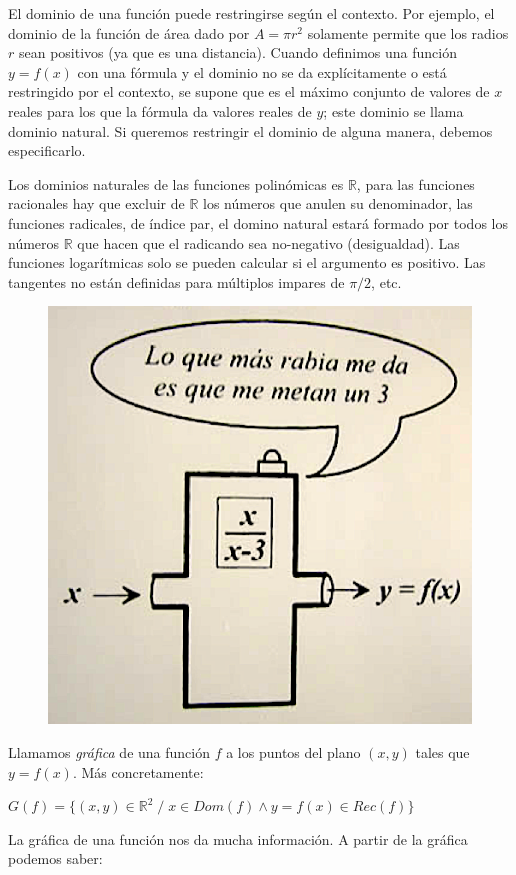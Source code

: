 		
	 El dominio de una función puede restringirse según el contexto. Por ejemplo, el dominio de la función de área dado por $A = \pi r^2$ solamente permite que los radios $r$ sean positivos (ya que es una distancia). Cuando definimos una función $y =f(x)$ con una fórmula y el dominio no se da explí­citamente o está restringido por el contexto, se supone que es el máximo conjunto de valores de $x$ reales para los que la fórmula da valores reales de $y$; este dominio se llama dominio natural. Si queremos restringir el dominio de alguna manera, debemos especificarlo.
	\begin{multicols}{2}
	Los dominios naturales de las funciones polinómicas es $\mathbb R$, para las funciones racionales hay que excluir de $\mathbb R$ los números que anulen su denominador, las funciones radicales, de í­ndice par, el domino natural estará formado por todos los números $\mathbb R$ que hacen que el radicando sea no-negativo (desigualdad). Las funciones logarí­tmicas solo se pueden calcular si el argumento es positivo. Las tangentes no están definidas para múltiplos impares de $\pi/2$, etc.
	
		\begin{figure}[H]
			\centering
			\includegraphics[width=0.35
			\textwidth]{imagenes/imagenes02/xiste02.png}
		\end{figure}
		\end{multicols}
	 \begin{defi}
	Llamamos \emph{gráfica} de una función $f$ a los puntos del plano $(x,y)$ tales que $y=f(x)$. Más concretamente:
	
	$G(f)=\{ (x,y)\in 	\mathbb R^2 \; / \; x\in Dom(f) \wedge y=f(x) \in Rec(f)   \}$	
	\end{defi}
	
	 La gráfica de una función nos da mucha información. A partir de la gráfica podemos saber:
	
